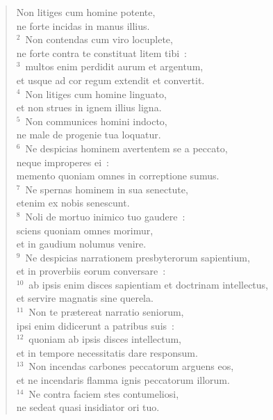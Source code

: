 \begin{flushleft}\begin{verse}\vspace{-19pt}Non litiges cum homine potente,\\ ne forte incidas in manus illius.\\
${}^{2}$~Non contendas cum viro locuplete,\\ ne forte contra te constituat litem tibi~:\\
${}^{3}$~multos enim perdidit aurum et argentum,\\ et usque ad cor regum extendit et convertit.\\
${}^{4}$~Non litiges cum homine linguato,\\ et non strues in ignem illius ligna.\\
${}^{5}$~Non communices homini indocto,\\ ne male de progenie tua loquatur.\\
${}^{6}$~Ne despicias hominem avertentem se a peccato,\\ neque improperes ei~:\\ memento quoniam omnes in correptione sumus.\\
${}^{7}$~Ne spernas hominem in sua senectute,\\ etenim ex nobis senescunt.\\
${}^{8}$~Noli de mortuo inimico tuo gaudere~:\\ sciens quoniam omnes morimur,\\ et in gaudium nolumus venire.\\
${}^{9}$~Ne despicias narrationem presbyterorum sapientium,\\ et in proverbiis eorum conversare~:\\
${}^{10}$~ab ipsis enim disces sapientiam et doctrinam intellectus,\\ et servire magnatis sine querela.\\
${}^{11}$~Non te pr\ae tereat narratio seniorum,\\ ipsi enim didicerunt a patribus suis~:\\
${}^{12}$~quoniam ab ipsis disces intellectum,\\ et in tempore necessitatis dare responsum.\\
${}^{13}$~Non incendas carbones peccatorum arguens eos,\\ et ne incendaris flamma ignis peccatorum illorum.\\
${}^{14}$~Ne contra faciem stes contumeliosi,\\ ne sedeat quasi insidiator ori tuo.\\

\end{verse}
\end{flushleft}
